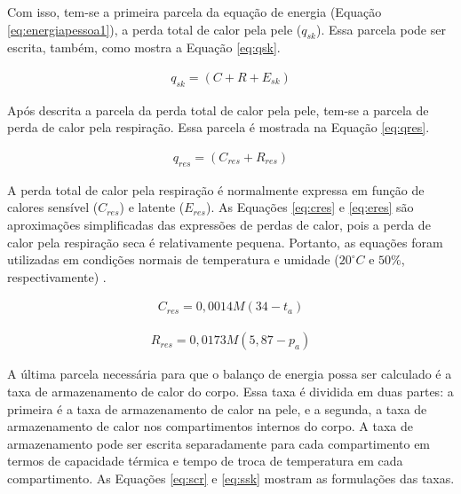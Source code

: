 \documentclass[acronym,symbols,table]{fei}
\begin{document}
Com isso, tem-se a primeira parcela da equação de energia (Equação \ref{eq:energiapessoa1}), a perda total de calor pela pele ($q_{sk}$). Essa parcela pode ser escrita, também, como mostra a Equação \ref{eq:qsk}.

\begin{equation} \label{eq:qsk}
    \begin{aligned}
   q_{sk}= (C + R + E_{sk})
    \end{aligned}
\end{equation}

Após descrita a parcela da perda total de calor pela pele, tem-se a parcela de perda de calor pela respiração. Essa parcela é mostrada na Equação \ref{eq:qres}.

\begin{equation} \label{eq:qres}
    \begin{aligned}
   q_{res}= (C_{res} + R_{res})
    \end{aligned}
\end{equation}

A perda total de calor pela respiração é normalmente expressa em função de calores sensível ($C_{res}$) e latente ($E_{res}$). As Equações \ref{eq:cres} e \ref{eq:eres} são aproximações simplificadas das expressões de perdas de calor, pois a perda de calor pela respiração seca é relativamente pequena. Portanto, as equações foram utilizadas em condições normais de temperatura e umidade ($20^\circ C$ e $50\%$, respectivamente) \cite{ASHRAE2009}.

\begin{equation} \label{eq:cres}
    \begin{aligned}
   C_{res}= 0,0014M(34-t_{a})
    \end{aligned}
\end{equation}

\begin{equation} \label{eq:eres}
    \begin{aligned}
   R_{res}= 0,0173M(5,87-p_{a})
    \end{aligned}
\end{equation}

A última parcela necessária para que o balanço de energia possa ser calculado é a taxa de armazenamento de calor do corpo. Essa taxa é dividida em duas partes: a primeira é a taxa de armazenamento de calor na pele, e a segunda, a taxa de armazenamento de calor nos compartimentos internos do corpo. A taxa de armazenamento pode ser escrita separadamente para cada compartimento em termos de capacidade térmica e tempo de troca de temperatura em cada compartimento. \cite{ASHRAE2009} As Equações \ref{eq:scr} e \ref{eq:ssk} mostram as formulações das taxas. 
\end{document}
